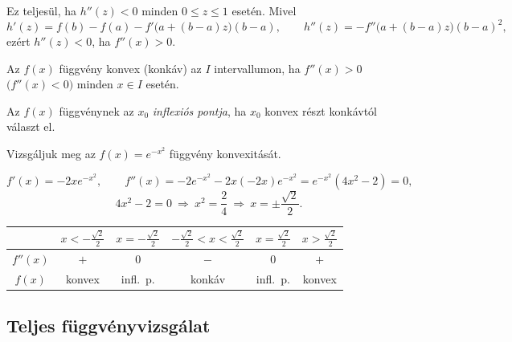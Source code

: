 \documentclass[11pt]{article}
\newcommand{\signtable}{\renewcommand{\arraystretch}{1.45}}
\begin{document}
\noindent Ez teljesül, ha $h''(z)<0$ minden $0\le z\le 1$ esetén. Mivel
\[
h'(z)=f(b)-f(a)-f'\bigl(a+(b-a)z\bigr)(b-a),\qquad h''(z)=-f''\bigl(a+(b-a)z\bigr)(b-a)^{2},
\]
ezért $h''(z)<0$, ha $f''(x)>0$.

\begin{thmbox}
\begin{theorem}
Az $f(x)$ függvény konvex (konkáv) az $I$ intervallumon, ha $f''(x)>0$ $\bigl(f''(x)<0\bigr)$ minden $x\in I$ esetén.
\end{theorem}
\end{thmbox}

\begin{defbox}
\begin{definition}
Az $f(x)$ függvénynek az $x_{0}$ \emph{inflexiós pontja}, ha $x_{0}$ konvex részt konkávtól választ el.
\end{definition}
\end{defbox}

\begin{exbox}
\begin{example}
Vizsgáljuk meg az $f(x)=e^{-x^{2}}$ függvény konvexitását.
\end{example}
\end{exbox}
\begin{solution}
\[
f'(x)=-2xe^{-x^{2}},\qquad
f''(x)=-2e^{-x^{2}}-2x(-2x)e^{-x^{2}}=e^{-x^{2}}(4x^{2}-2)=0,
\]
\[
4x^{2}-2=0\ \Longrightarrow\ x^{2}=\frac{2}{4}\ \Longrightarrow\ x=\pm\frac{\sqrt{2}}{2}.
\]
\begin{center}
\signtable
\begin{tabular}{c|ccccc}
\hline
 & $x<-\frac{\sqrt{2}}{2}$ & $x=-\frac{\sqrt{2}}{2}$ & $-\frac{\sqrt{2}}{2}<x<\frac{\sqrt{2}}{2}$ & $x=\frac{\sqrt{2}}{2}$ & $x>\frac{\sqrt{2}}{2}$\\
\hline
$f''(x)$ & $+$ & $0$ & $-$ & $0$ & $+$\\
$f(x)$ & konvex & infl.\ p. & konkáv & infl.\ p. & konvex\\
\hline
\end{tabular}
\end{center}
\end{solution}

\subsection{Teljes függvényvizsgálat}
\end{document}
